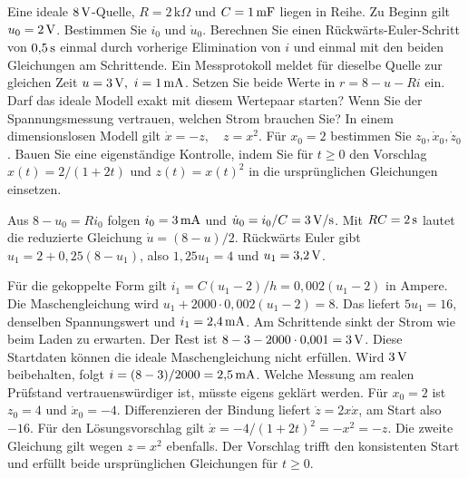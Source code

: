 Eine ideale \(8\,\mathrm{V}\)-Quelle, \(R=2\,\mathrm{k}\Omega\) und \(C=1\,\mathrm{mF}\) liegen in Reihe. Zu Beginn gilt \(u_0=2\,\mathrm{V}\). Bestimmen Sie \(i_0\) und \(\dot u_0\). Berechnen Sie einen Rückwärts-Euler-Schritt von \(0{,}5\,\mathrm{s}\) einmal durch vorherige Elimination von \(i\) und einmal mit den beiden Gleichungen am Schrittende.
Ein Messprotokoll meldet für dieselbe Quelle zur gleichen Zeit \(u=3\,\mathrm{V},\ i=1\,\mathrm{mA}\). Setzen Sie beide Werte in \(r=8-u-Ri\) ein. Darf das ideale Modell exakt mit diesem Wertepaar starten? Wenn Sie der Spannungsmessung vertrauen, welchen Strom brauchen Sie?
In einem dimensionslosen Modell gilt \(\dot x=-z,\quad z=x^2\). Für \(x_0=2\) bestimmen Sie \(z_0,\dot x_0,\dot z_0\). Bauen Sie eine eigenständige Kontrolle, indem Sie für \(t\ge0\) den Vorschlag \(x(t)=2/(1+2t)\) und \(z(t)=x(t)^2\) in die ursprünglichen Gleichungen einsetzen.

\schreibfeld



Aus \(8-u_0=Ri_0\) folgen \(i_0=3\,\mathrm{mA}\) und \(\dot u_0=i_0/C=3\,\mathrm{V/s}\). Mit \(RC=2\,\mathrm{s}\) lautet die reduzierte Gleichung \(\dot u=(8-u)/2\). Rückwärts Euler gibt \(u_1=2+0{,}25(8-u_1)\), also \(1{,}25u_1=4\) und \(u_1=3{,}2\,\mathrm{V}\).

Für die gekoppelte Form gilt \(i_1=C(u_1-2)/h=0{,}002(u_1-2)\) in Ampere. Die Maschengleichung wird \(u_1+2000\cdot0{,}002(u_1-2)=8\). Das liefert \(5u_1=16\), denselben Spannungswert und \(i_1=2{,}4\,\mathrm{mA}\). Am Schrittende sinkt der Strom wie beim Laden zu erwarten.
Der Rest ist \(8-3-2000\cdot0{,}001=3\,\mathrm{V}\). Diese Startdaten können die ideale Maschengleichung nicht erfüllen. Wird \(3\,\mathrm{V}\) beibehalten, folgt \(i=(8-3)/2000=2{,}5\,\mathrm{mA}\). Welche Messung am realen Prüfstand vertrauenswürdiger ist, müsste eigens geklärt werden.
Für \(x_0=2\) ist \(z_0=4\) und \(\dot x_0=-4\). Differenzieren der Bindung liefert \(\dot z=2x\dot x\), am Start also \(-16\). Für den Lösungsvorschlag gilt \(\dot x=-4/(1+2t)^2=-x^2=-z\). Die zweite Gleichung gilt wegen \(z=x^2\) ebenfalls. Der Vorschlag trifft den konsistenten Start und erfüllt beide ursprünglichen Gleichungen für \(t\ge0\).


